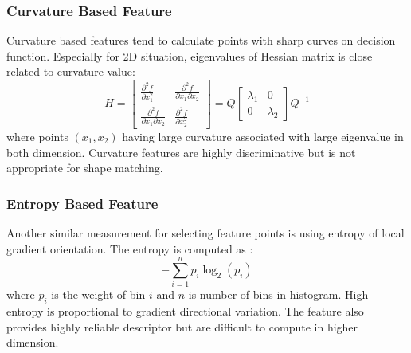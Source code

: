 \subsubsection{Curvature Based Feature}
Curvature based features tend to calculate points with sharp curves on decision function. Especially for 2D situation, eigenvalues of Hessian matrix is close related to curvature value:
\begin{equation}
\label{eq:svshessian}
H=
\begin{bmatrix}
    \frac{\partial^2f}{\partial x^2_1} & \frac{\partial^2f}{\partial x_1\partial x_2}\\
    \frac{\partial^2f}{\partial x_1\partial x_2} & \frac{\partial^2f}{\partial x^2_2}
\end{bmatrix}
=Q
\begin{bmatrix}
    \lambda_1 & 0\\
    0 & \lambda_2
\end{bmatrix}
Q^{-1}
\end{equation}
where points $(x_1,x_2)$ having large curvature associated with large eigenvalue in both dimension. Curvature features are highly discriminative but is not appropriate for shape matching.

\subsubsection{Entropy Based Feature}
Another similar measurement for selecting feature points is using entropy of local gradient orientation. The entropy is computed as \cite{Nguyen2013}:
\begin{equation}
\label{eq:svsentropy}
-\sum_{i=1}^np_i\log_2(p_i)
\end{equation}
where $p_i$ is the weight of bin $i$ and $n$ is number of bins in histogram. High entropy is proportional to gradient directional variation. The feature also provides highly reliable descriptor but are difficult to compute in higher dimension.
